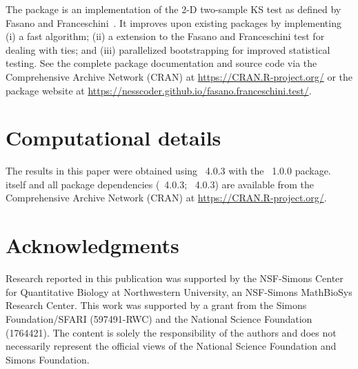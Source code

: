 \documentclass[codesnippet]{jss}
\newcommand{\RBnote}[1]{\textcolor{red}{#1}}
\begin{document}
The  package is an  implementation of the 2-D two-sample KS test as defined by Fasano and Franceschini~\citep{Fasano1987}.
It improves upon existing packages by implementing
  (i) a fast algorithm;
  (ii) a extension to the Fasano and Franceschini test for dealing with ties; and
  (iii) parallelized bootstrapping for improved statistical testing.
  See the complete package documentation and source code via the Comprehensive
 Archive Network (CRAN) at
\url{https://CRAN.R-project.org/} or the package website at \url{https://nesscoder.github.io/fasano.franceschini.test/}.



\section*{Computational details}


The results in this paper were obtained using
~4.0.3 with the
~1.0.0 package.  itself
and all package dependencies (~4.0.3; ~4.0.3) are available from the Comprehensive
 Archive Network (CRAN) at
\url{https://CRAN.R-project.org/}.


\section*{Acknowledgments}

Research reported in this publication was supported by the NSF-Simons Center for Quantitative Biology at Northwestern University, an NSF-Simons MathBioSys Research Center. This work was supported by a grant from the Simons Foundation/SFARI (597491-RWC) and the National Science Foundation (1764421). The content is solely the responsibility of the authors and does not necessarily represent the official views of the National Science Foundation and Simons Foundation.
\end{document}
